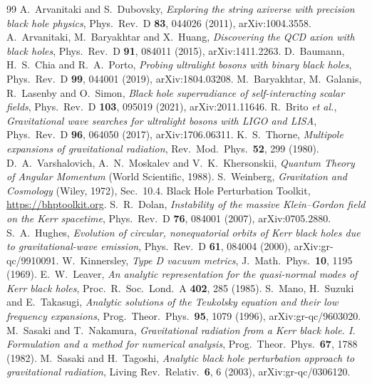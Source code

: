 \documentclass[11pt]{article}
\begin{document}
\begin{thebibliography}{99}
 A.~Arvanitaki and S.~Dubovsky, \emph{Exploring the string axiverse with precision black hole physics}, Phys.\ Rev.\ D \textbf{83}, 044026 (2011), arXiv:1004.3558.
 A.~Arvanitaki, M.~Baryakhtar and X.~Huang, \emph{Discovering the QCD axion with black holes}, Phys.\ Rev.\ D \textbf{91}, 084011 (2015), arXiv:1411.2263.
 D.~Baumann, H.~S.~Chia and R.~A.~Porto, \emph{Probing ultralight bosons with binary black holes}, Phys.\ Rev.\ D \textbf{99}, 044001 (2019), arXiv:1804.03208.
 M.~Baryakhtar, M.~Galanis, R.~Lasenby and O.~Simon, \emph{Black hole superradiance of self-interacting scalar fields}, Phys.\ Rev.\ D \textbf{103}, 095019 (2021), arXiv:2011.11646.
 R.~Brito \emph{et al.}, \emph{Gravitational wave searches for ultralight bosons with LIGO and LISA}, Phys.\ Rev.\ D \textbf{96}, 064050 (2017), arXiv:1706.06311.
 K.~S.~Thorne, \emph{Multipole expansions of gravitational radiation}, Rev.\ Mod.\ Phys.\ \textbf{52}, 299 (1980).
 D.~A.~Varshalovich, A.~N.~Moskalev and V.~K.~Khersonskii, \emph{Quantum Theory of Angular Momentum} (World Scientific, 1988).
 S.~Weinberg, \emph{Gravitation and Cosmology} (Wiley, 1972), Sec.~10.4.
 Black Hole Perturbation Toolkit, \url{https://bhptoolkit.org}.
 S.~R.~Dolan, \emph{Instability of the massive Klein--Gordon field on the Kerr spacetime}, Phys.\ Rev.\ D \textbf{76}, 084001 (2007), arXiv:0705.2880.
 S.~A.~Hughes, \emph{Evolution of circular, nonequatorial orbits of Kerr black holes due to gravitational-wave emission}, Phys.\ Rev.\ D \textbf{61}, 084004 (2000), arXiv:gr-qc/9910091.
 W.~Kinnersley, \emph{Type D vacuum metrics}, J.\ Math.\ Phys.\ \textbf{10}, 1195 (1969).
 E.~W.~Leaver, \emph{An analytic representation for the quasi-normal modes of Kerr black holes}, Proc.\ R.\ Soc.\ Lond.\ A \textbf{402}, 285 (1985).
 S.~Mano, H.~Suzuki and E.~Takasugi, \emph{Analytic solutions of the Teukolsky equation and their low frequency expansions}, Prog.\ Theor.\ Phys.\ \textbf{95}, 1079 (1996), arXiv:gr-qc/9603020.
 M.~Sasaki and T.~Nakamura, \emph{Gravitational radiation from a Kerr black hole. I. Formulation and a method for numerical analysis}, Prog.\ Theor.\ Phys.\ \textbf{67}, 1788 (1982).
 M.~Sasaki and H.~Tagoshi, \emph{Analytic black hole perturbation approach to gravitational radiation}, Living Rev.\ Relativ.\ \textbf{6}, 6 (2003), arXiv:gr-qc/0306120.

\end{thebibliography}
\end{document}
